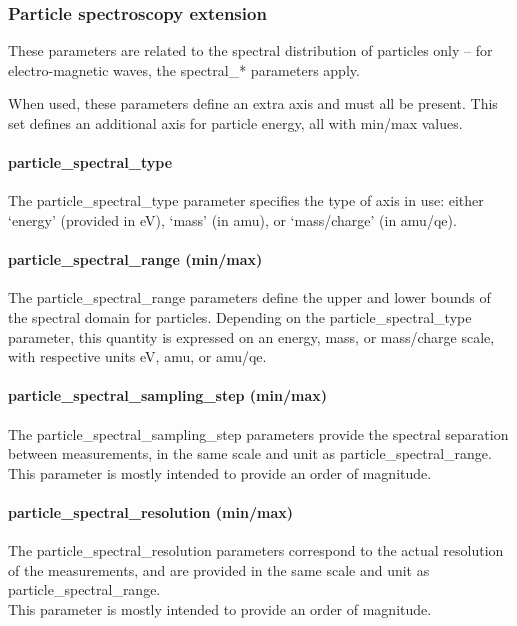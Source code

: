 \documentclass[11pt,a4paper]{ivoa}
\begin{document}
\subsubsection{Particle spectroscopy extension}

These parameters are related to the spectral distribution of particles
only -- for electro-magnetic waves, the spectral\_* parameters apply.

When used, these parameters define an extra axis and must all be present.
This set defines an additional axis for particle energy,
all with min/max values.

\paragraph{particle\_spectral\_type}

The particle\_spectral\_type parameter specifies the type of axis in use:
either `energy' (provided in eV), `mass' (in amu), or `mass/charge'
(in amu/qe).

\paragraph{particle\_spectral\_range (min/max)}

The particle\_spectral\_range parameters define the upper and
lower bounds of the spectral domain for particles. Depending on the
particle\_spectral\_type parameter, this quantity is expressed on an
energy, mass, or mass/charge scale, with respective units eV, amu,
or amu/qe.

\paragraph{particle\_spectral\_sampling\_step (min/max)}

The particle\_spectral\_sampling\_step parameters provide the
spectral separation between measurements, in the same scale and unit as
particle\_spectral\_range.\\
This parameter is mostly intended to provide an order of magnitude.

\paragraph{particle\_spectral\_resolution (min/max)}

The particle\_spectral\_resolution parameters correspond to the actual
resolution of the measurements, and are provided in the same scale and
unit as particle\_spectral\_range. \\
This parameter is mostly intended to provide an order of magnitude.
\end{document}
